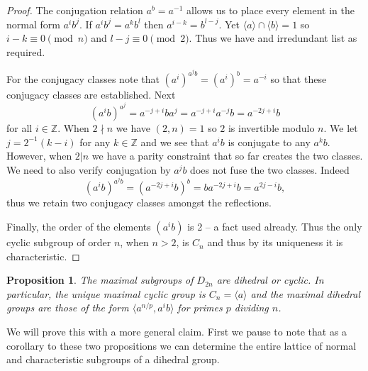 \documentclass[12pt]{article}
\newtheorem{prop}[thm]{Proposition}
\providecommand{\ndivides}{\nmid}
\providecommand{\intersect}{\cap}
\begin{document}
\begin{proof}
The conjugation relation $a^b=a^{-1}$ allows us to place every element
in the normal form $a^i b^j$.  If $a^i b^j = a^k b^l$ then 
$a^{i-k}= b^{l-j}$.  Yet $\langle a\rangle \intersect \langle b\rangle=1$
so $i-k\equiv 0\pmod{n}$ and $l-j\equiv 0\pmod{2}$.  Thus we have and
irredundant list as required.

For the conjugacy classes note that $(a^i)^{a^j b}=(a^i)^b=a^{-i}$ so
that these conjugacy classes are established.  Next 
\[(a^i b)^{a^j}=a^{-j+i}ba^j=a^{-j+i}a^{-j}b=a^{-2j+i}b\]
for all $i\in \mathbb{Z}$.  When $2\ndivides n$ we have $(2,n)=1$ so $2$ is invertible modulo $n$.  We let $j=2^{-1}(k-i)$ for any $k\in \mathbb{Z}$ and we see that $a^i b$ is conjugate to any $a^k b$.  However, when $2|n$ we have a parity constraint that
so far creates the two classes.  We need to also verify conjugation by
$a^jb$ does not fuse the two classes.  Indeed
\[(a^i b)^{a^j b}=(a^{-2j+i}b)^b=ba^{-2j+i}b=a^{2j-i}b,\]
thus we retain two conjugacy classes amongst the reflections.

Finally, the order of the elements $(a^i b)$ is 2 -- a fact used already.
Thus the only cyclic subgroup of order $n$, when $n>2$, is $C_n$ and
thus by its uniqueness it is characteristic.
\end{proof}

\begin{prop}
The maximal subgroups of $D_{2n}$ are dihedral or cyclic.  In particular,
the unique maximal cyclic group is $C_n=\langle a\rangle$ and the
maximal dihedral groups are those of the form $\langle a^{n/p}, a^ib\rangle$
for primes $p$ dividing $n$.
\end{prop}

We will prove this with a more general claim.  First we pause to note that as a corollary to these two propositions we can determine the entire lattice of normal and characteristic subgroups of a dihedral group.  
\end{document}
